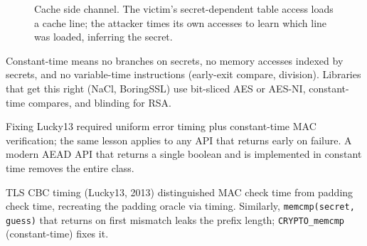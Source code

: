\begin{figure}[h]\centering
{}
\caption{Cache side channel. The victim's secret-dependent table access loads a cache line; the attacker times its own accesses to learn which line was loaded, inferring the secret.}
\label{fig:cache-channel}
\end{figure}

Constant-time means no branches on secrets, no memory accesses indexed by secrets, and no variable-time instructions (early-exit compare, division). Libraries that get this right (NaCl, BoringSSL) use bit-sliced AES or AES-NI, constant-time compares, and blinding for RSA.

\begin{example}
Fixing Lucky13 required uniform error timing plus constant-time MAC verification; the same lesson applies to any API that returns early on failure. A modern AEAD API that returns a single boolean and is implemented in constant time removes the entire class.

\end{example}

\begin{example}
TLS CBC timing (Lucky13, 2013) distinguished MAC check time from padding check time, recreating the padding oracle via timing. Similarly, \texttt{memcmp(secret, guess)} that returns on first mismatch leaks the prefix length; \texttt{CRYPTO\_memcmp} (constant-time) fixes it.
\end{example}


